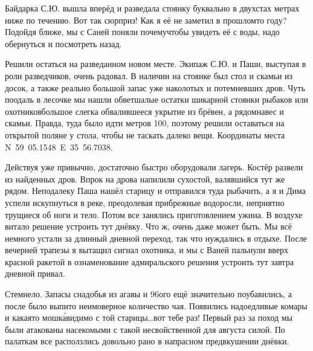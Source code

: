 Байдарка С.Ю. вышла вперёд и разведала стоянку буквально в двухстах метрах ниже по течению. Вот так сюрприз! Как я её не заметил в прошлом\sdash то году? Подойдя ближе, мы с Саней поняли почему\mdash  чтобы увидеть её с воды, надо обернуться и посмотреть назад. 

Решили остаться на разведанном новом месте. Экипаж С.Ю. и Паши, выступая в роли разведчиков, очень радовал. В наличии на стоянке был стол и скамьи из досок, а также реально большой запас уже наколотых и потемневших дров. Чуть поодаль в лесочке мы нашли обветшалые остатки шикарной стоянки рыбаков или охотников\mdash  большое слегка обвалившееся укрытие из брёвен, а рядом\mdash  навес и скамьи. Правда, туда было идти метров 100, поэтому решили оставаться на открытой поляне у стола, чтобы не таскать далеко вещи. Координаты места N~59\degree~05.1548\textprime~E~35\degree~56.7038\textprime. 

Действуя уже привычно, достаточно быстро оборудовали лагерь. Костёр развели из найденных дров. Впрок на дрова напилили сухостой, валявшийся тут же рядом. Неподалеку Паша нашёл старицу и отправился туда рыбачить, а я и Дима успели искупнуться в реке, преодолевая прибрежные водоросли, неприятно трущиеся об ноги и тело. Потом все занялись приготовлением ужина. В воздухе витало решение устроить тут днёвку. Что ж, очень даже может быть. Мы всё немного устали за длинный дневной переход, так что нуждались в отдыхе. После вечерней трапезы я вытащил сигнал охотника, и мы с Ваней пальнули вверх красной ракетой в ознаменование адмиральского решения устроить тут завтра дневной привал.

Стемнело. Запасы снадобья из агавы и 96\sdash ого ещё значительно поубавились, а после было выпито неимоверное количество чая. Появились надоедливые комары и какая\sdash то мошк\'{а}\mdash  видимо с той старицы\ldots вот тебе раз! Первый раз за поход мы были атакованы насекомыми с такой несвойственной для августа силой. По палаткам все расползлись довольно рано в напрасном предвкушении днёвки. 

\begin{center}
\end{center}
